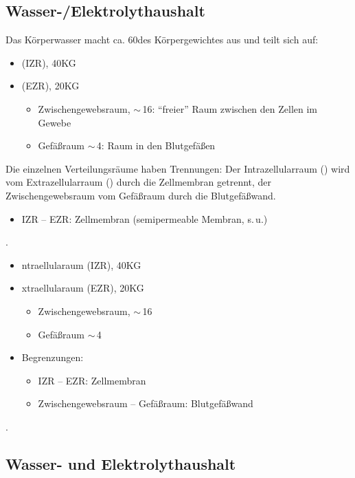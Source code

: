 \documentclass[
ngerman,
paper=a4,
asymmetric,
fontsize=10pt,
draft=false,
numbers=noenddot,
bibtotocnumbered,
footnotes=multiple,
]{scrreprt}
\newcommand{\jALT}{\vspace{6pt}\noindent{\color{red}\sffamily\textbf{DELETED}\hrulefill\newline}}
\newcommand{\jALTende}{\newline{\color{red}\rule{\linewidth}{2pt}\newline}}
\newcommand{\jNEU}{\vspace{6pt}\noindent{\color{green}\sffamily\textbf{ADDED}\hrulefill\newline}}
\newcommand{\jNEUende}{\newline{\color{green}\rule{\linewidth}{3pt}\newline}}
\begin{document}
\subsection{Wasser-/Elektrolythaushalt}
 {%
 Das Körperwasser macht ca. 60\PC* des Körpergewichtes
 aus und teilt sich auf:
 \begin{itemize}
   \item {} (IZR), 40\PC* KG
   \item {} (EZR), 20\PC* KG
   \begin{itemize}
     \item {}Zwischengewebsraum,
     $\sim$\,16\PC*: \enquote{freier}
     Raum zwischen den Zellen im Gewebe
     \item {}Gefäßraum $\sim$\,4\PC*:
     Raum in den Blutgefäßen
   \end{itemize}
 \end{itemize}
 Die einzelnen Verteilungsräume haben Trennungen: Der
 Intrazellularraum () wird vom Extrazellularraum
 () durch die Zellmembran getrennt, der
 Zwischengewebsraum vom Gefäßraum durch die Blutgefäßwand.
}{%
\jALT
 \begin{itemize}
    \item IZR -- EZR:    Zellmembran (semipermeable Membran,
    s.\,u.)
    \end{itemize}
    .
    \jALTende
    
    \jNEU
    \begin{itemize}
  \item {}ntraellularaum (IZR), 40\PC* KG
  \item {}xtraellularaum (EZR), 20\PC* KG
  \begin{itemize}
    \item Zwischengewebsraum,
    $\sim$\,16\PC*
    \item Gefäßraum $\sim$\,4\PC*
  \end{itemize}
  \item Begrenzungen:
  \begin{itemize}
    \item IZR -- EZR:    Zellmembran 
     \item Zwischengewebsraum -- Gefäßraum:  Blutgefäßwand
  \end{itemize}
 \end{itemize}
 .
 \jNEUende
  }{}{}{}
  
  \clearpage
  \jALT
 \subsection{Wasser- und Elektrolythaushalt}
\label{topic:wasser-elektrolythaushalt}
\end{document}
